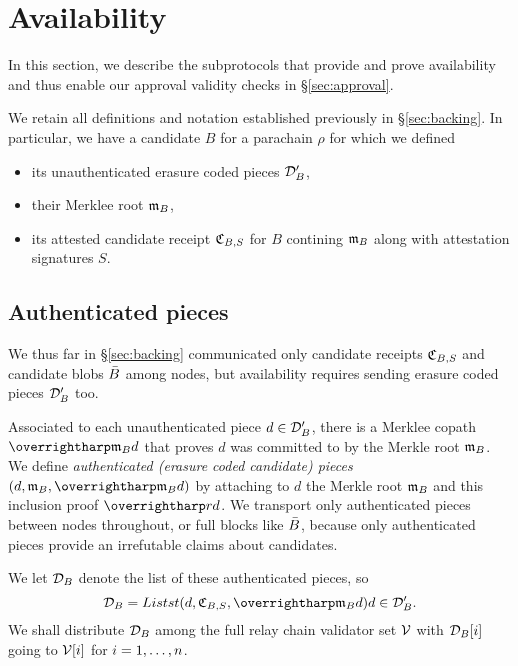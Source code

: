 
\section{Availability}
\label{sec:availability}


In this section, we describe the subprotocols that provide and prove availability and thus enable our approval validity checks in \S\ref{sec:approval}.  

We retain all definitions and notation established previously in \S\ref{sec:backing}.  In particular, we have a candidate $B$ for a parachain $\rho$ for which we defined
\begin{itemize}
\item its unauthenticated erasure coded pieces $\mathcal{D}'_B$,
\item their Merklee root $\mathfrak{m}_B$, 
\item its attested candidate receipt $\mathfrak{C}_{B,S}$ for $B$ contining $\mathfrak{m}_B$ along with attestation signatures $S$.
\end{itemize}


\subsection{Authenticated pieces}
\label{sec:authenticated_pieces}

We thus far in \S\ref{sec:backing} communicated only candidate receipts $\mathfrak{C}_{B,S}$ and candidate blobs $\bar{B}$ among nodes, but availability requires sending erasure coded pieces $\mathcal{D}'_B$ too.

Associated to each unauthenticated piece $d \in \mathcal{D}'_B$, there is a Merklee copath $\vect{\merkleroot_B d}$ that proves $d$ was committed to by the Merkle root $\mathfrak{m}_B$.  
We define {\em authenticated (erasure coded candidate) pieces} $(d,\merkleroot_B,\vect{\merkleroot_B d})$ by attaching to $d$ the Merkle root $\mathfrak{m}_B$ and this inclusion proof $\vect{rd}$.  
We transport only authenticated pieces between nodes throughout, or full blocks like $\bar{B}$, because only authenticated pieces provide an irrefutable claims about candidates. 

We let $\mathcal{D}_B$ denote the list of these authenticated pieces, so
$$ \pieces_B = Listst{ (d,\receipt_{B,S},\vect{\merkleroot_B d}) }{ d \in \prepieces_B } \mathperiod $$
%
We shall distribute $\mathcal{D}_B$ among the full relay chain validator set $\mathcal{V}$ with $\mathcal{D}_B[i]$ going to $\mathcal{V}[i]$ for $i = 1,\ldots,n$.  

